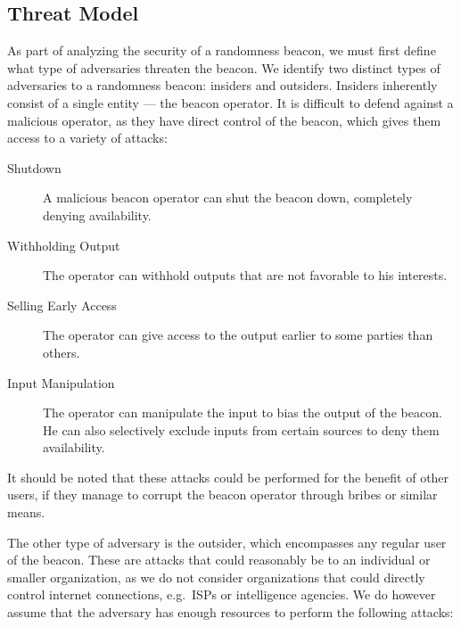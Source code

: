 \subsection{Threat Model}
As part of analyzing the security of a randomness beacon, we must first define what type of adversaries threaten the beacon. We identify two distinct types of adversaries to a randomness beacon: insiders and outsiders. Insiders inherently consist of a single entity --- the beacon operator. It is difficult to defend against a malicious operator, as they have direct control of the beacon, which gives them access to a variety of attacks:

\begin{description}
    \item [Shutdown] A malicious beacon operator can shut the beacon down, completely denying availability. 
    \item [Withholding Output] The operator can withhold outputs that are not favorable to his interests. 
    \item [Selling Early Access] The operator can give access to the output earlier to some parties than others.
    \item [Input Manipulation] The operator can manipulate the input to bias the output of the beacon. He can also selectively exclude inputs from certain sources to deny them availability. 

\end{description} 

It should be noted that these attacks could be performed for the benefit of other users, if they manage to corrupt the beacon operator through bribes or similar means. 

The other type of adversary is the outsider, which encompasses any regular user of the beacon. These are attacks that could reasonably be to an individual or smaller organization, as we do not consider organizations that could directly control internet connections, e.g.\ ISPs or intelligence agencies. We do however assume that the adversary has enough resources to perform the following attacks:

